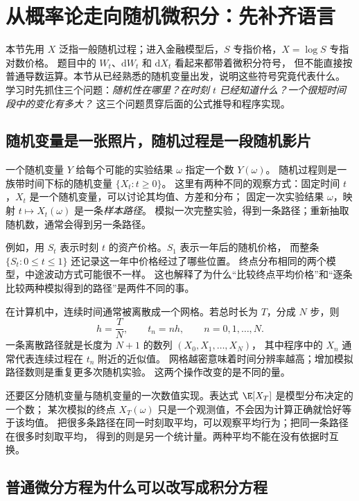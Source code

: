 \section{从概率论走向随机微积分：先补齐语言}
\label{bg:sec:language}

本节先用 $X$ 泛指一般随机过程；进入金融模型后，$S$ 专指价格，$X=\log S$ 专指对数价格。
题目中的 $W_t$、$\mathrm dW_t$ 和 $\mathrm dX_t$ 看起来都带着微积分符号，
但不能直接按普通导数运算。本节从已经熟悉的随机变量出发，说明这些符号究竟代表什么。
学习时先抓住三个问题：\emph{随机性在哪里？在时刻 $t$ 已经知道什么？一个很短时间段中的变化有多大？}
这三个问题贯穿后面的公式推导和程序实现。

\subsection{随机变量是一张照片，随机过程是一段随机影片}
\label{bg:sub:process}

一个随机变量 $Y$ 给每个可能的实验结果 $\omega$ 指定一个数 $Y(\omega)$。
随机过程则是一族带时间下标的随机变量 $\{X_t:t\geq 0\}$。
这里有两种不同的观察方式：固定时间 $t$，$X_t$ 是一个随机变量，可以讨论其均值、方差和分布；
固定一次实验结果 $\omega$，映射 $t\mapsto X_t(\omega)$ 是一条\emph{样本路径}。
模拟一次完整实验，得到一条路径；重新抽取随机数，通常会得到另一条路径。

例如，用 $S_t$ 表示时刻 $t$ 的资产价格。$S_1$ 表示一年后的随机价格，
而整条 $\{S_t:0\leq t\leq 1\}$ 还记录这一年中价格经过了哪些位置。
终点分布相同的两个模型，中途波动方式可能很不一样。
这也解释了为什么“比较终点平均价格”和“逐条比较两种模拟得到的路径”是两件不同的事。

在计算机中，连续时间通常被离散成一个网格。若总时长为 $T$，分成 $N$ 步，则
\begin{equation}
  h=\frac{T}{N},\qquad t_n=nh,\qquad n=0,1,\ldots,N.
  \label{bg:eq:grid}
\end{equation}
一条离散路径就是长度为 $N+1$ 的数列 $(X_0,X_1,\ldots,X_N)$，
其中程序中的 $X_n$ 通常代表连续过程在 $t_n$ 附近的近似值。
网格越密意味着时间分辨率越高；增加模拟路径数则是重复更多次随机实验。
这两个操作改变的是不同的量。

还要区分随机变量与随机变量的一次数值实现。表达式 $\E[X_T]$ 是模型分布决定的一个数；
某次模拟的终点 $X_T(\omega)$ 只是一个观测值，不会因为计算正确就恰好等于该均值。
把很多条路径在同一时刻取平均，可以观察平均行为；把同一条路径在很多时刻取平均，
得到的则是另一个统计量。两种平均不能在没有依据时互换。

\subsection{普通微分方程为什么可以改写成积分方程}
\label{bg:sub:ode}

